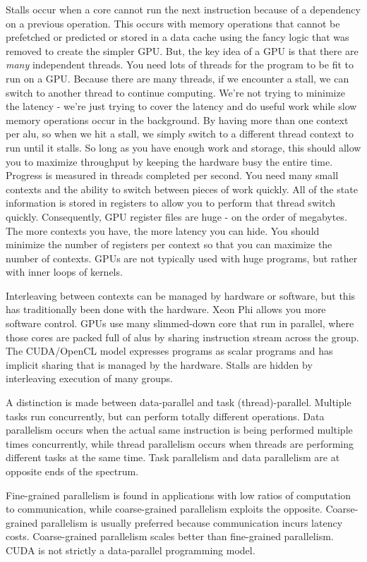 \documentclass[10pt]{article}
\begin{document}
\begin{flushleft}
Stalls occur when a core cannot run the next instruction because of a dependency on a previous operation. This occurs with memory operations that cannot be prefetched or predicted or stored in a data cache using the fancy logic that was removed to create the simpler GPU. But, the key idea of a GPU is that there are \textit{many} independent threads. You need lots of threads for the program to be fit to run on a GPU. Because there are many threads, if we encounter a stall, we can switch to another thread to continue computing. We're not trying to minimize the latency - we're just trying to cover the latency and do useful work while slow memory operations occur in the background. By having more than one context per \gls{alu}, so when we hit a stall, we simply switch to a different thread context to run until it stalls. So long as you have enough work and storage, this should allow you to maximize throughput by keeping the hardware busy the entire time. Progress is measured in threads completed per second. You need many small contexts and the ability to switch between pieces of work quickly. All of the state information is stored in registers to allow you to perform that thread switch quickly. Consequently, GPU register files are huge - on the order of megabytes. The more contexts you have, the more latency you can hide. You should minimize the number of registers per context so that you can maximize the number of contexts. GPUs are not typically used with huge programs, but rather with inner loops of kernels. 

Interleaving between contexts can be managed by hardware or software, but this has traditionally been done with the hardware. Xeon Phi allows you more software control. GPUs use many slimmed-down core that run in parallel, where those cores are packed full of \gls{alu}s by sharing instruction stream across the group. The CUDA/OpenCL model expresses programs as scalar programs and has implicit sharing that is managed by the hardware. Stalls are hidden by interleaving execution of many groups. 

A distinction is made between data-parallel and task (thread)-parallel. Multiple tasks run concurrently, but can perform totally different operations. Data parallelism occurs when the actual same instruction is being performed multiple times concurrently, while thread parallelism occurs when threads are performing different tasks at the same time. Task parallelism and data parallelism are at opposite ends of the spectrum. 

Fine-grained parallelism is found in applications with low ratios of computation to communication, while coarse-grained parallelism exploits the opposite. Coarse-grained parallelism is usually preferred because communication incurs latency costs. Coarse-grained parallelism scales better than fine-grained parallelism. CUDA is not strictly a data-parallel programming model. 


\end{flushleft}
\end{document}
